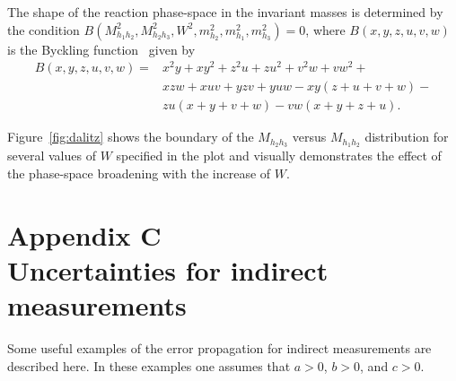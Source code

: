 The shape of the reaction phase-space in the invariant masses is determined by the condition $B(M_{h_{1}h_{2}}^{2}, M_{h_{2}h_{3}}^{2}, W^{2}, m_{h_{2}}^{2}, m_{h_{1}}^{2}, m_{h_{3}}^{2}) = 0$, where $B(x, y, z, u, v, w)$ is the Byckling function~\cite{Byckling:1971vca} given by 
\begin{equation}
\begin{split}
B(x,y,z,u,v,w) = &x^{2}y+xy^{2}+z^{2}u+zu^{2}+v^{2}w+vw^{2}+ \\   
&xzw+xuv+yzv+yuw- xy(z+u+v+w)- \\ 
&zu(x+y+v+w)-vw(x+y+z+u).
\label{eq:byckling}
\end{split}
\end{equation}

Figure~\ref{fig:dalitz} shows the boundary of the $M_{h_{2}h_{3}}$ versus $M_{h_{1}h_{2}}$ distribution for several values of $W$ specified in the plot and visually demonstrates the effect  of the phase-space broadening with the increase of $W$.




\renewcommand{\thechapter}{C}
    \makeatletter
   \renewcommand{\theequation}{\thechapter.\@arabic\c@equation}
    \makeatother
\chapter*{\LARGE Appendix C \\\tiny\vspace{-0.4\baselineskip} \LARGE Uncertainties for indirect measurements}
\label{app_uncert}



Some useful examples of the error propagation for indirect measurements are described here. In these examples one assumes that $a>0$, $b>0$, and $c>0$.



